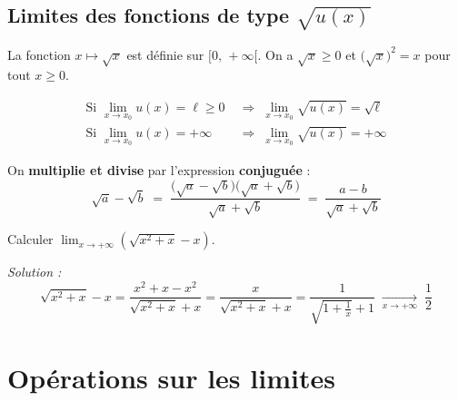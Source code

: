 \subsection{Limites des fonctions de type \texorpdfstring{$\sqrt{u(x)}$}{sqrt(u(x))}}

\begin{rappel}
  La fonction $x \mapsto \sqrt{x}$ est d\'{e}finie sur $[0,\,+\infty[$.
  On a $\sqrt{x} \geq 0$ et $\bigl(\sqrt{x}\bigr)^2 = x$ pour tout $x \geq 0$.
\end{rappel}

\begin{propriete}
  \begin{align*}
    \text{Si } \lim_{x \to x_0} u(x) = \ell \geq 0
    &\;\Longrightarrow\;
    \lim_{x \to x_0} \sqrt{u(x)} = \sqrt{\ell} \\[8pt]
    \text{Si } \lim_{x \to x_0} u(x) = +\infty
    &\;\Longrightarrow\;
    \lim_{x \to x_0} \sqrt{u(x)} = +\infty
  \end{align*}
\end{propriete}

\begin{methode}
  On \textbf{multiplie et divise} par l'expression \textbf{conjugu\'{e}e} :
  \[
    \sqrt{a} - \sqrt{b}
    \;=\;
    \frac{\bigl(\sqrt{a}-\sqrt{b}\bigr)\bigl(\sqrt{a}+\sqrt{b}\bigr)}
         {\sqrt{a}+\sqrt{b}}
    \;=\;
    \frac{a - b}{\sqrt{a}+\sqrt{b}}
  \]
\end{methode}

\begin{exemple}
  Calculer $\displaystyle\lim_{x \to +\infty}\!\left(\sqrt{x^2+x}-x\right)$.

  \medskip
  \textit{Solution :}
  \[
    \sqrt{x^2+x} - x
    = \frac{x^2+x - x^2}{\sqrt{x^2+x}+x}
    = \frac{x}{\sqrt{x^2+x}+x}
    = \frac{1}{\sqrt{1+\frac{1}{x}}+1}
    \;\xrightarrow[x\to+\infty]{}\; \frac{1}{2}
  \]
\end{exemple}

\newpage
\section{Op\'{e}rations sur les limites}

